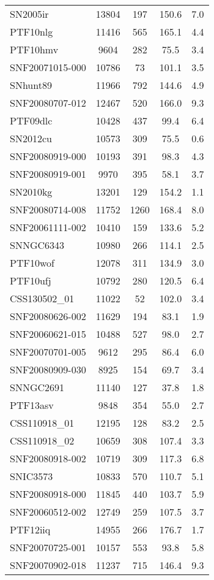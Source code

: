 \begin{longtable}{lcccc}
SN2005ir & 13804 & 197 & 150.6 & 7.0 \\
PTF10nlg & 11416 & 565 & 165.1 & 4.4 \\
PTF10hmv & 9604 & 282 & 75.5 & 3.4 \\
SNF20071015-000 & 10786 & 73 & 101.1 & 3.5 \\
SNhunt89 & 11966 & 792 & 144.6 & 4.9 \\
SNF20080707-012 & 12467 & 520 & 166.0 & 9.3 \\
PTF09dlc & 10428 & 437 & 99.4 & 6.4 \\
SN2012cu & 10573 & 309 & 75.5 & 0.6 \\
SNF20080919-000 & 10193 & 391 & 98.3 & 4.3 \\
SNF20080919-001 & 9970 & 395 & 58.1 & 3.7 \\
SN2010kg & 13201 & 129 & 154.2 & 1.1 \\
SNF20080714-008 & 11752 & 1260 & 168.4 & 8.0 \\
SNF20061111-002 & 10410 & 159 & 133.6 & 5.2 \\
SNNGC6343 & 10980 & 266 & 114.1 & 2.5 \\
PTF10wof & 12078 & 311 & 134.9 & 3.0 \\
PTF10ufj & 10792 & 280 & 120.5 & 6.4 \\
CSS130502\_01 & 11022 & 52 & 102.0 & 3.4 \\
SNF20080626-002 & 11629 & 194 & 83.1 & 1.9 \\
SNF20060621-015 & 10488 & 527 & 98.0 & 2.7 \\
SNF20070701-005 & 9612 & 295 & 86.4 & 6.0 \\
SNF20080909-030 & 8925 & 154 & 69.7 & 3.4 \\
SNNGC2691 & 11140 & 127 & 37.8 & 1.8 \\
PTF13asv & 9848 & 354 & 55.0 & 2.7 \\
CSS110918\_01 & 12195 & 128 & 83.2 & 2.5 \\
CSS110918\_02 & 10659 & 308 & 107.4 & 3.3 \\
SNF20080918-002 & 10719 & 309 & 117.3 & 6.8 \\
SNIC3573 & 10833 & 570 & 110.7 & 5.1 \\
SNF20080918-000 & 11845 & 440 & 103.7 & 5.9 \\
SNF20060512-002 & 12749 & 259 & 107.5 & 3.7 \\
PTF12iiq & 14955 & 266 & 176.7 & 1.7 \\
SNF20070725-001 & 10157 & 553 & 93.8 & 5.8 \\
SNF20070902-018 & 11237 & 715 & 146.4 & 9.3 \\

\end{longtable}
